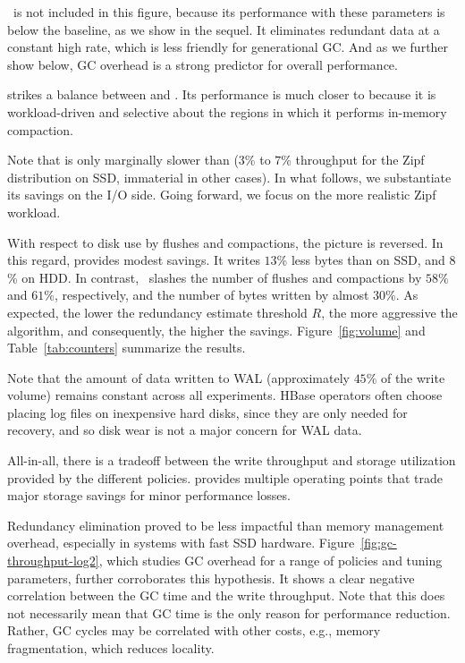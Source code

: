 \eager\ is not included in this figure, because its performance with these parameters is below the baseline, as we show in the sequel.
It eliminates redundant data at a constant high rate,
which is less friendly for generational GC. And as we further show below, GC overhead is a strong predictor for 
overall 
performance. 

\adp\/ strikes a balance between \basic\/ and \eager. Its performance is much closer to \basic\/ 
because it is workload-driven and selective about the regions in which it performs in-memory compaction.  



Note that \adp\/ is only marginally slower than \basic\/ ($3$\% to $7$\% throughput for the Zipf 
distribution on SSD, immaterial in other cases).  In what follows, we substantiate  its savings 
on the I/O side. Going forward, we focus on the more realistic Zipf workload.




With respect to disk use by flushes and compactions, the picture is reversed. In this regard, 
\basic\/ provides modest savings. It writes $13$\% less bytes than \none\/ on SSD, and $8$\% 
on HDD. In contrast, \adp\ slashes the number of flushes and compactions by $58\%$ and $61$\%, 
respectively, and the number of bytes written by almost $30\%$. As expected, the lower the 
redundancy estimate threshold $R$, the more aggressive the algorithm, and consequently, 
the higher the savings. Figure~\ref{fig:volume} and Table~\ref{tab:counters} summarize the results. 

Note that the amount of data written to WAL %
(approximately $45$\% of the write volume) remains constant across all  experiments. 
HBase operators often choose placing log files on inexpensive hard disks, since they are only needed for recovery,
and so disk wear is not a major concern for WAL data.

All-in-all, there is a tradeoff between the write throughput and storage utilization 
provided by the different \sys\/ policies. \adp\/ provides multiple operating points that trade major 
storage savings for minor performance losses.

 Redundancy elimination proved to be less impactful 
than memory management overhead, especially in systems with fast SSD hardware. 
Figure~\ref{fig:gc-throughput-log2}, which studies GC overhead for a range of policies and tuning 
parameters, further corroborates this hypothesis. It shows a clear negative correlation between the 
GC time and the write throughput. 
Note that this does not necessarily mean that GC time is the only reason for performance reduction. Rather,
GC cycles may be correlated with other costs, e.g., memory fragmentation, which reduces locality.

